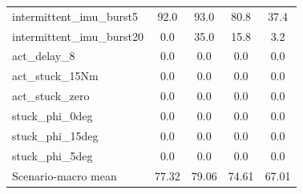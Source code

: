 \documentclass[preprint,12pt,authoryear=false]{elsarticle}
\theoremstyle{remark}\newtheorem{remark}{Remark}
\theoremstyle{plain}\newtheorem{proposition}{Proposition}\newtheorem{lemma}{Lemma}
\theoremstyle{definition}\newtheorem{assumption}{Assumption}
\begin{document}
\begin{table}[h]
\begin{tabular}{lcccc}
intermittent\_imu\_burst5 & 92.0 & 93.0 & 80.8 & 37.4\\
intermittent\_imu\_burst20 & 0.0 & 35.0 & 15.8 & 3.2\\
act\_delay\_8 & 0.0 & 0.0 & 0.0 & 0.0\\
act\_stuck\_15Nm & 0.0 & 0.0 & 0.0 & 0.0\\
act\_stuck\_zero & 0.0 & 0.0 & 0.0 & 0.0\\
stuck\_phi\_0deg & 0.0 & 0.0 & 0.0 & 0.0\\
stuck\_phi\_15deg & 0.0 & 0.0 & 0.0 & 0.0\\
stuck\_phi\_5deg & 0.0 & 0.0 & 0.0 & 0.0\\\midrule
Scenario-macro mean & 77.32 & 79.06 & 74.61 & 67.01\\\bottomrule
\end{tabular}
\end{table}
\end{document}
